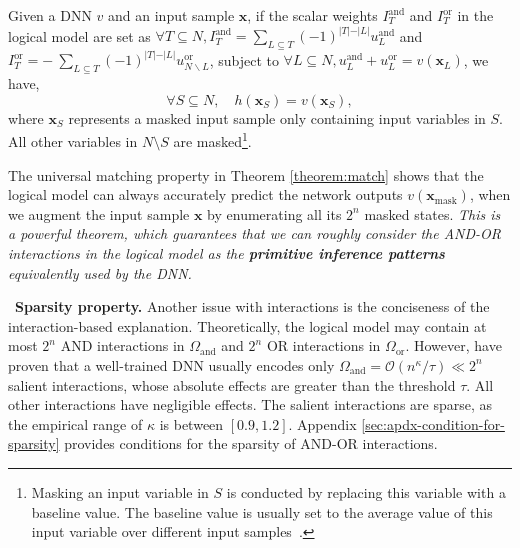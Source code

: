 \documentclass[10pt,twocolumn,letterpaper]{article}
\begin{document}
\begin{theorem}\label{theorem:match}
Given a DNN $v$ and an input sample $\mathbf{x}$, if the scalar weights $I^{\text{and}}_T$  and $I^{\text{or}}_T$ in the logical model are set as $\forall T\subseteq N, I^{\text{and}}_T = \sum\nolimits_{L \subseteq T} (-1)^{\vert T \vert - \vert L \vert} u^{\text{and}}_L$ and $I^{\text{or}}_T = - \ \sum\nolimits_{L \subseteq T} (-1)^{\vert T \vert - \vert L \vert} u^{\text{or}}_{N \backslash L}$, subject to $\forall L\subseteq N, u^{\text{and}}_L+u^{\text{or}}_L=v(\mathbf{x}_L)$, we have,
\vspace{-1pt}
\begin{equation}
    \forall S \subseteq N, \quad h(\mathbf{x}_S) = v(\mathbf{x}_S),
\end{equation}
where $\mathbf{x}_S$ represents a masked input sample only containing input variables in $S$. All other variables in $N \setminus S$ are masked\footnote[5]{
Masking an input variable in $S$ is conducted by replacing this variable with a baseline value. The baseline value is usually set to the average value of this input variable over different input samples~\citep{dabkowski2017real}.}.
\end{theorem}
\vspace{-2pt}
The universal matching property in Theorem \ref{theorem:match} shows that the logical model can always accurately predict the network outputs $v(\mathbf{x}_{\text{mask}})$, when we augment the input sample $\mathbf{x}$ by enumerating all its $2^n$ masked states. \textit{This is a powerful theorem, which guarantees that we can roughly consider the AND-OR interactions in the logical model as the \textbf{primitive inference patterns} equivalently used by the DNN.}


\textbullet \ \textbf{Sparsity property.}
Another issue with interactions is the conciseness of the interaction-based explanation. Theoretically, the logical model may contain at most $2^n$ AND interactions in $\Omega_{\text{and}}$ and $2^n$ OR interactions in $\Omega_{\text{or}}$. However, \citet{ren2024we} have proven that a well-trained DNN usually encodes only \( \Omega_{\text{and}} = \mathcal{O}(n^{\kappa} / \tau) \ll 2^n \) salient interactions,
whose absolute effects are greater than the threshold $\tau$. All other interactions have negligible effects. The salient interactions are sparse, as the empirical range of \( \kappa \) is between \( [0.9, 1.2] \). Appendix \ref{sec:apdx-condition-for-sparsity} provides conditions for the sparsity of AND-OR interactions.
\end{document}
